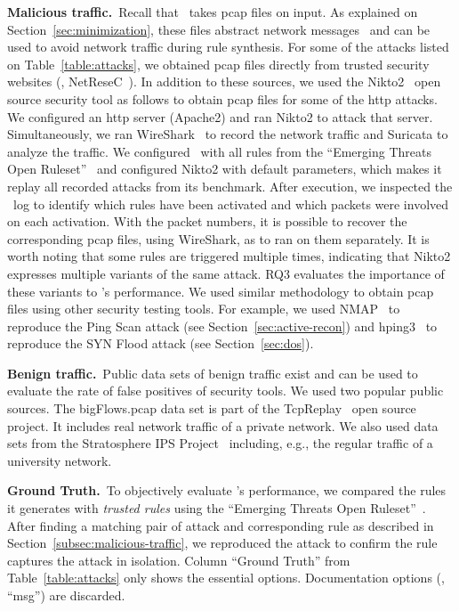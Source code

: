 \documentclass[conference]{IEEEtran}
\begin{document}
\noindent\textbf{Malicious traffic.}~Recall that \tname\ takes
pcap files on input. As explained on Section~\ref{sec:minimization},
these files abstract network messages~\cite{pcap} and can be used to
avoid network traffic during rule synthesis. For some of the attacks
listed on Table~\ref{table:attacks}, we obtained pcap files directly
from trusted security websites (\eg{},
NetReseC~\cite{pcap-attacks}). In addition to these sources, we used
the Nikto2~\cite{nikto} open source security tool as follows to obtain
pcap files for some of the http attacks. We configured an http server
(Apache2) and ran Nikto2 to attack that server. Simultaneously, we ran
WireShark~\cite{wireshark-net-monitor} to record the network traffic
and Suricata to analyze the traffic. We configured \suri\ with all
rules from the ``Emerging Threats Open
Ruleset''~\cite{emerging-threats-open} and configured Nikto2 with
default parameters, which makes it replay all recorded attacks from
its benchmark. After execution, we inspected the \suri\ log to
identify which rules have been activated and which packets were
involved on each activation. With the packet numbers, it is possible
to recover the corresponding pcap files, using WireShark, as to ran
\tname{} on them separately. It is worth noting that some rules are
triggered multiple times, indicating that Nikto2 expresses multiple
variants of the same attack. RQ3 evaluates the importance of these
variants to \tname{}'s performance. We used similar methodology to
obtain pcap files using other security testing tools. For example, we
used NMAP~\cite{netmap} to reproduce the Ping Scan attack (see
Section~\ref{sec:active-recon}) and hping3~\cite{hping3} to reproduce
the SYN Flood attack (see Section~\ref{sec:dos}).

\noindent\textbf{Benign traffic.}~Public data sets of benign traffic
exist and can be used to evaluate the rate of false positives of
security tools. We used two popular public sources. The bigFlows.pcap
data set is part of the TcpReplay~\cite{tcpreplay} open source
project. It includes real network traffic of a private network. We
also used data sets from the Stratosphere IPS
Project~\cite{stratosphere-normal} including, e.g., the regular
traffic of a university network.

\noindent\textbf{Ground Truth.}~To objectively evaluate \tname{}'s
performance, we compared the rules it generates with \emph{trusted
  rules} using the ``Emerging Threats Open
Ruleset''~\cite{emerging-threats-open}. After finding a
matching pair of attack and corresponding rule as
described in Section~\ref{subsec:malicious-traffic}, we reproduced the
attack to confirm the rule captures the attack in isolation. Column
``Ground Truth'' from Table~\ref{table:attacks} only shows the
essential options. Documentation options (\eg{}, ``msg'') are
discarded.
\end{document}
